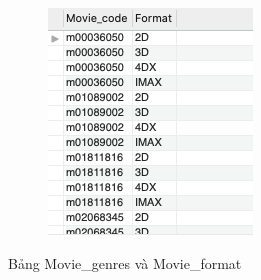 \begin{figure}[H]
\begin{subfigure}{.5\textwidth}
  \includegraphics[width=.8\linewidth]{images/FORMAT.png}
\end{subfigure}
\caption{Bảng Movie\_genres và Movie\_format}
\end{figure}

